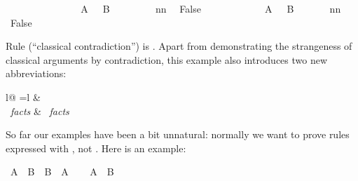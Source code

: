 \begin{isabellebody}
\isanewline
\ \ \ \ \ \ \isamarkupfalse%
\isanewline
\ \ \ \ \ \ \isamarkupfalse%
\ {\isachardoublequoteopen}{\isasymnot}\ A\ {\isasymor}\ {\isasymnot}\ B{\isachardoublequoteclose}\ \isacommand{{\isachardot}{\isachardot}}\isamarkupfalse%
\isanewline
\ \ \ \ \ \ \isamarkupfalse%
\ nn\ \isamarkupfalse%
\ False\ \isacommand{{\isachardot}{\isachardot}}\isamarkupfalse%
\isanewline
\ \ \ \ \isamarkupfalse%
\isanewline
\ \ \ \ \isamarkupfalse%
\ {\isachardoublequoteopen}{\isasymnot}\ A\ {\isasymor}\ {\isasymnot}\ B{\isachardoublequoteclose}\ \isacommand{{\isachardot}{\isachardot}}\isamarkupfalse%
\isanewline
\ \ \ \ \isamarkupfalse%
\ nn\ \isamarkupfalse%
\ False\ \isacommand{{\isachardot}{\isachardot}}\isamarkupfalse%
\isanewline
\ \ \isamarkupfalse%
\isanewline
{}\isamarkupfalse%
%
\endisatagproof
{\isafoldproof}%
%
\isadelimproof
%
\endisadelimproof
%
\begin{isamarkuptext}%
\noindent
Rule  (``classical contradiction'') is
.
Apart from demonstrating the strangeness of classical
arguments by contradiction, this example also introduces two new
abbreviations:
\begin{center}
\begin{tabular}{l@ {\quad=\quad}l}
 &   \\
~\emph{facts} &
~\emph{facts} 
\end{tabular}
\end{center}%
\end{isamarkuptext}%
\isamarkuptrue%
%
\isamarkuptrue%
%
\begin{isamarkuptext}%
So far our examples have been a bit unnatural: normally we want to
prove rules expressed with \isa{{\isasymLongrightarrow}}, not \isa{{\isasymlongrightarrow}}. Here is an example:%
\end{isamarkuptext}%
\isamarkuptrue%
\isamarkupfalse%
\ {\isachardoublequoteopen}A\ {\isasymand}\ B\ {\isasymLongrightarrow}\ B\ {\isasymand}\ A{\isachardoublequoteclose}\isanewline
%
\isadelimproof
%
\endisadelimproof
%
\isatagproof
{}\isamarkupfalse%
\isanewline
\ \ \isamarkupfalse%
\ {\isachardoublequoteopen}A\ {\isasymand}\ B{\isachardoublequoteclose}\ \isamarkupfalse%

\end{isabellebody}
